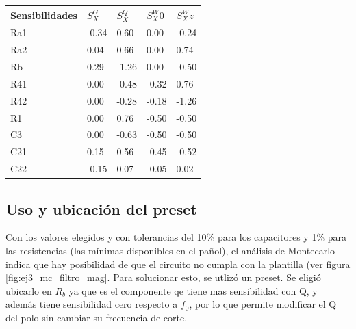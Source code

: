 \documentclass[../../tc_tp5_main.tex]{subfiles}
\begin{document}
\begin{table}[H]
\centering
\begin{tabular}{l|llll}
\hline
Sensibilidades & $S_X^G$   & $S_X^Q$   & $S_X^W0$  & $S_X^Wz$  \\
\hline
Ra1            & -0.34 & 0.60  & 0.00  & -0.24 \\
Ra2            & 0.04  & 0.66  & 0.00  & 0.74  \\
Rb            & 0.29  & -1.26 & 0.00  & -0.50 \\
R41            & 0.00  & -0.48 & -0.32 & 0.76  \\
R42            & 0.00  & -0.28 & -0.18 & -1.26 \\
R1            & 0.00  & 0.76  & -0.50 & -0.50 \\
C3            & 0.00  & -0.63 & -0.50 & -0.50 \\
C21            & 0.15  & 0.56  & -0.45 & -0.52 \\
C22           & -0.15 & 0.07  & -0.05 & 0.02 \\
\hline
\end{tabular}
\end{table}



\subsection{Uso y ubicaci\'on del preset}
Con los valores elegidos y con tolerancias del 10\% para los capacitores y 1\% para las resistencias (las m\'inimas disponibles en el pa\~nol), el an\'alisis de Montecarlo indica que hay posibilidad de que el circuito no cumpla con la plantilla (ver figura \ref{fig:ej3_mc_filtro_mag}. Para solucionar esto, se utliz\'o un preset. Se eligi\'o ubicarlo en $R_b$ ya que es el componente qe tiene mas sensibilidad con Q, y adem\'as tiene sensibilidad cero respecto a $f_0$, por lo que permite modificar el Q del polo sin cambiar su frecuencia de corte.
\end{document}
